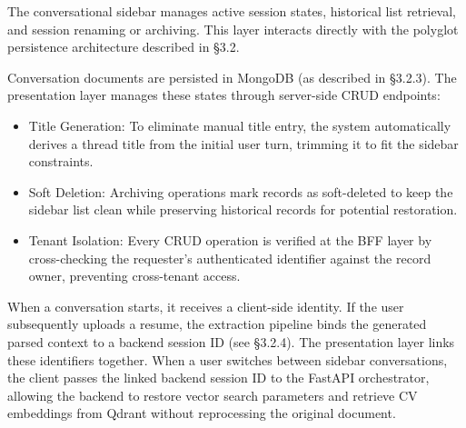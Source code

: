 \documentclass[12pt, a4paper]{report}
\begin{document}
\vspace{0.6cm}
\vspace{0.4cm}

The conversational sidebar manages active session states, historical list retrieval, and session renaming or archiving. This layer interacts directly with the polyglot persistence architecture described in \S3.2.

\vspace{0.3cm}

Conversation documents are persisted in MongoDB (as described in \S3.2.3). The presentation layer manages these states through server-side CRUD endpoints:
\begin{itemize}
    \item Title Generation: To eliminate manual title entry, the system automatically derives a thread title from the initial user turn, trimming it to fit the sidebar constraints.
    \item Soft Deletion: Archiving operations mark records as soft-deleted to keep the sidebar list clean while preserving historical records for potential restoration.
    \item Tenant Isolation: Every CRUD operation is verified at the BFF layer by cross-checking the requester's authenticated identifier against the record owner, preventing cross-tenant access.
\end{itemize}

\vspace{0.3cm}

When a conversation starts, it receives a client-side identity. If the user subsequently uploads a resume, the extraction pipeline binds the generated parsed context to a backend session ID (see §3.2.4). The presentation layer links these identifiers together. When a user switches between sidebar conversations, the client passes the linked backend session ID to the FastAPI orchestrator, allowing the backend to restore vector search parameters and retrieve CV embeddings from Qdrant without reprocessing the original document.

\vspace{0.6cm}
\vspace{0.4cm}
\end{document}

